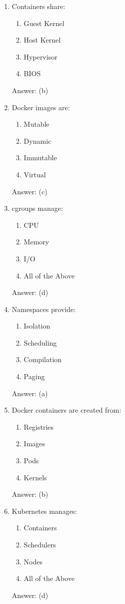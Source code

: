 \begin{enumerate}
\item Containers share:
\begin{enumerate}[label=(\alph*)]
\item Guest Kernel
\item Host Kernel
\item Hypervisor
\item BIOS
\end{enumerate}
Answer: (b)

\item Docker images are:
\begin{enumerate}[label=(\alph*)]
\item Mutable
\item Dynamic
\item Immutable
\item Virtual
\end{enumerate}
Answer: (c)

\item cgroups manage:
\begin{enumerate}[label=(\alph*)]
\item CPU
\item Memory
\item I/O
\item All of the Above
\end{enumerate}
Answer: (d)

\item Namespaces provide:
\begin{enumerate}[label=(\alph*)]
\item Isolation
\item Scheduling
\item Compilation
\item Paging
\end{enumerate}
Answer: (a)

\item Docker containers are created from:
\begin{enumerate}[label=(\alph*)]
\item Registries
\item Images
\item Pods
\item Kernels
\end{enumerate}
Answer: (b)

\item Kubernetes manages:
\begin{enumerate}[label=(\alph*)]
\item Containers
\item Schedulers
\item Nodes
\item All of the Above
\end{enumerate}
Answer: (d)


\end{enumerate}

